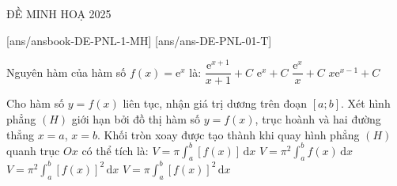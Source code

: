 \begin{name}
    {\tenchude}
    {ĐỀ MINH HOẠ 2025}
    {\tentruong}
    {\thoigian}
\end{name}

[ans/ansbook-DE-PNL-1-MH]
\TN
{}[ans/ans-DE-PNL-01-T]


\begin{ex}%
    Nguyên hàm của hàm số $f(x) = \mathrm{e}^x$ là:
    \choice
    {$\dfrac{\mathrm{e}^{x+1}}{x+1} + C$}
    {\True $\mathrm{e}^x + C$}
    {$\dfrac{\mathrm{e}^x}{x} + C$}
    {$x \mathrm{e}^{x-1} + C$}
\end{ex}

\begin{ex}%
    Cho hàm số $y = f(x)$ liên tục, nhận giá trị dương trên đoạn $[a;b]$. Xét hình phẳng $(H)$ giới hạn bởi đồ thị hàm số $y = f(x)$, trục hoành và hai đường thẳng $x = a$, $x = b$. Khối tròn xoay được tạo thành khi quay hình phẳng $(H)$ quanh trục $Ox$ có thể tích là:
    \choice
    {$V = \pi \displaystyle \int_a^b [f(x)] \mathrm{\,d}x$}
    {$V = \pi^2 \displaystyle \int_a^b f(x) \mathrm{\,d}x$}
    {$V = \pi^2 \displaystyle \int_a^b [f(x)]^2 \mathrm{\,d}x$}
    {\True $V = \pi \displaystyle \int_a^b [f(x)]^2 \mathrm{\,d}x$}
\end{ex}

